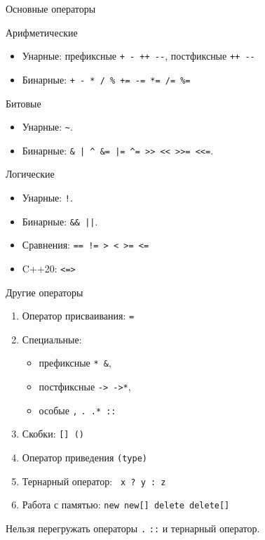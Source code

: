 \documentclass{beamer}
\begin{document}
\begin{frame}[fragile]{Основные операторы}
    \begin{block}{Арифметические}
        \begin{itemize}
            \item Унарные: префиксные {\color{blue}\verb!+ - ++ --!},
                постфиксные {\color{blue}\verb!++ --!}
            \item Бинарные: {\color{blue}\verb!+ - * / % += -= *= /= %=!}
        \end{itemize}
    \end{block}
    \begin{block}{Битовые}
        \begin{itemize}
            \item Унарные: {\color{blue}\verb!~!}.
            \item Бинарные: {\color{blue}\verb!& | ^ &= |= ^= >> << >>= <<=!}.
        \end{itemize}
    \end{block}
    \begin{block}{Логические}
        \begin{itemize}
            \item Унарные: {\color{blue}\verb#!#}. 
            \item Бинарные: {\color{blue}\verb!&& ||!}.
            \item Сравнения: {\color{blue}\verb#== != > < >= <=#}
            \item C++20: {\color{blue}\verb#<=>#}
        \end{itemize}
    \end{block}
\end{frame}

\begin{frame}[fragile]{Другие операторы}
        \begin{enumerate}
            \item Оператор присваивания: {\color{blue}\verb!=!}
            \item Специальные: 
                \begin{itemize}
                    \item префиксные {\color{blue}\verb!* &!}, 
                    \item постфиксные  {\color{blue}\verb!-> ->*!}, 
                    \item особые {\color{blue}\verb!,! \verb!. .* ::!}
                \end{itemize}
            \item Скобки: {\color{blue}\verb![] ()!}
            \item Оператор приведения {\color{blue} \verb!(type)!}
            \item Тернарный оператор: {\color{blue}\verb! x ? y : z !}
            \item Работа с памятью: {\color{blue}\verb!new new[] delete delete[]!}
        \end{enumerate}

    Нельзя перегружать операторы {\color{blue}\verb!.! \verb!::!} и тернарный
    оператор.
\end{frame}
\end{document}

